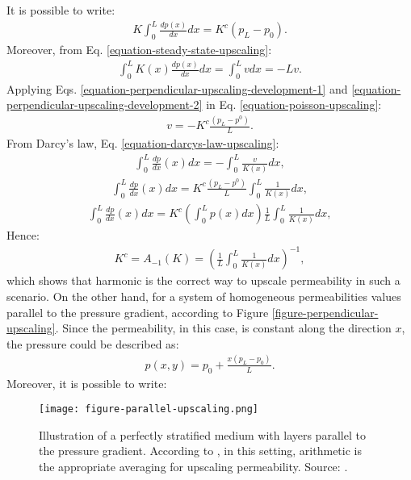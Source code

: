 \noindent
%
It is possible to write:
%
\begin{align}
	\label{equation-perpendicular-upscaling-development-1}
	K\int_{0}^{L}\frac{dp(x)}{dx}dx=K^c(p_L-p_0).
\end{align}
%
Moreover, from Eq. \ref{equation-steady-state-upscaling}:
%
\begin{align}
	\label{equation-perpendicular-upscaling-development-2}
	\int_{0}^{L}K(x)\frac{dp(x)}{dx}dx= \int_{0}^{L}v dx = -Lv.
\end{align}
%
Applying Eqs. \ref{equation-perpendicular-upscaling-development-1} and \ref{equation-perpendicular-upscaling-development-2} in Eq. \ref{equation-poisson-upscaling}:
%
\begin{align}
	v=-K^c\frac{(p_L-p^0)}{L}.
\end{align}
%
From Darcy's law, Eq. \ref{equation-darcys-law-upscaling}:
%
\begin{align}
	\int_{0}^{L}\frac{dp}{dx}(x)dx=-\int_{0}^{L}\frac{v}{K(x)}dx,
\end{align}
%
\begin{align}
	\int_{0}^{L}\frac{dp}{dx}(x)dx=K^c\frac{(p_L-p^0)}{L}\int_{0}^{L}\frac{1}{K(x)}dx,
\end{align}
%
\begin{align}
	\int_{0}^{L}\frac{dp}{dx}(x)dx=K^c\left(\int_{0}^{L}p(x)dx\right)\frac{1}{L}\int_{0}^{L}\frac{1}{K(x)}dx,
\end{align}
%
Hence:
%
\begin{align}
	K^c=A_{-1}(K)=\left(\frac{1}{L}\int_{0}^{L}\frac{1}{K(x)}dx\right)^{-1},
\end{align}
%
which shows that harmonic is the correct way to upscale permeability in such a scenario. 
%
On the other hand, for a system of homogeneous permeabilities values parallel to the pressure gradient, according to Figure \ref{figure-perpendicular-upscaling}.
%
Since the permeability, in this case, is constant along the direction $x$, the pressure could be described as:
%
\begin{align}
	p(x,y)=p_0+\frac{x(p_L-p_0)}{L}.
\end{align}
%
Moreover, it is possible to write:
%
\begin{figure}
	\centering
	\texttt{[image: figure-parallel-upscaling.png]}
	\caption{Illustration of a perfectly stratified medium with layers parallel to the pressure gradient. According to \cite{Lie2015}, in this setting, arithmetic is the appropriate averaging for upscaling permeability. Source: \cite{Lie2015}.}
	\label{figure-parallel-upscaling}
\end{figure}
